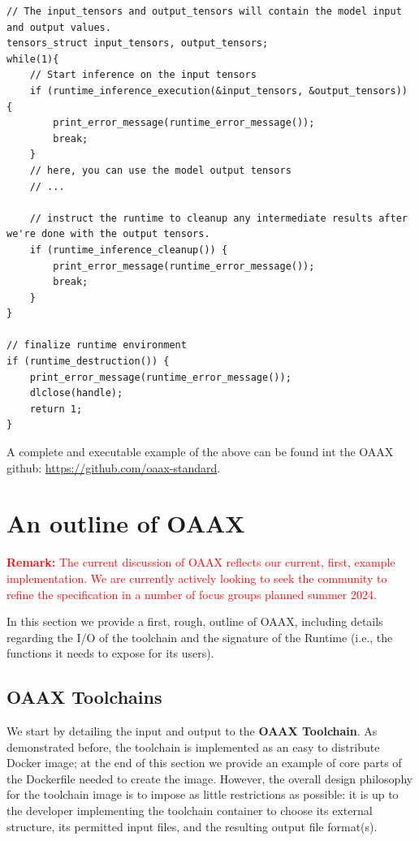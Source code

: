 \documentclass{article}
\newcommand{\remark}[1]{\textcolor{red}{\textbf{\newline Remark:} \newline #1 \newline}}
\newcommand{\oaaxgit}{\href{https://github.com/oaax-standard}{https://github.com/oaax-standard}}
\begin{document}
\begin{lstlisting}
// The input_tensors and output_tensors will contain the model input and output values.
tensors_struct input_tensors, output_tensors;
while(1){
    // Start inference on the input tensors
    if (runtime_inference_execution(&input_tensors, &output_tensors)) {
        print_error_message(runtime_error_message());
        break;
    }
    // here, you can use the model output tensors
    // ...

    // instruct the runtime to cleanup any intermediate results after we're done with the output tensors.
    if (runtime_inference_cleanup()) {
        print_error_message(runtime_error_message());
        break;
    }
}

// finalize runtime environment
if (runtime_destruction()) {
    print_error_message(runtime_error_message());
    dlclose(handle);
    return 1;
}
\end{lstlisting}

A complete and executable example of the above can be found int the OAAX github: \oaaxgit.

\newpage
\section{An outline of OAAX}
\label{sec:oaax-outline}

\remark{The current discussion of OAAX reflects our current, first, example implementation. We are currently actively looking to seek the community to refine the specification in a number of focus groups planned summer 2024.}

In this section we provide a first, rough, outline of OAAX, including details regarding the I/O of the toolchain and the signature of the Runtime (i.e., the functions it needs to expose for its users).

\subsection{OAAX Toolchains}

We start by detailing the input and output to the \textbf{OAAX Toolchain}. As demonstrated before, the toolchain is implemented as an easy to distribute Docker image; at the end of this section we provide an example of core parts of the Dockerfile needed to create the image. However, the overall design philosophy for the toolchain image is to impose as little restrictions as possible: it is up to the developer implementing the toolchain container to choose its external structure, its permitted input files, and the resulting output file format(s).
\end{document}
